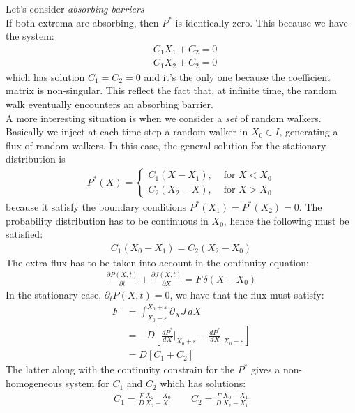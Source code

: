 \documentclass[4apaper,11pt,fleqn]{article}
\theoremstyle{remark}
\theoremstyle{definition}
\begin{document}
Let's consider \emph{absorbing barriers}\\
If both extrema are absorbing, then $P^*$ is identically zero. This because we have the system:
\begin{align*}
  &C_1 X_1 + C_2 = 0 \\
  &C_1 X_2 + C_2 = 0
\end{align*}
which has solution $C_1 = C_2 = 0$ and it's the only one because the coefficient matrix is non-singular. This reflect the fact that, at infinite time, the random walk eventually encounters an absorbing barrier. \\
A more interesting situation is when we consider a \emph{set} of random walkers. Basically we inject at each time step a random walker in $X_0 \in I$, generating a flux of random walkers.
In this case, the general solution for the stationary distribution is
\begin{align*}
  P^{*}(X)=\left\{\begin{array}{ll}{C_{1}\left(X-X_{1}\right),} & {\text { for } X<X_{0}} \\
  {C_{2}\left(X_{2}-X\right),} & {\text { for } X>X_{0}}\end{array}\right. %
\end{align*}
because it satisfy the boundary conditions $P^*(X_1)=P^*(X_2)=0$. The probability distribution has to be continuous in $X_0$, hence the following must be satisfied:
\begin{align*}
  C_{1}\left(X_{0}-X_{1}\right)=C_{2}\left(X_{2}-X_{0}\right)
\end{align*}
The extra flux has to be taken into account in the continuity equation:
\begin{align*}
  \frac{\partial P(X, t)}{\partial t}+\frac{\partial J(X, t)}{\partial X}= F \, \delta (X - X_0)
\end{align*}
In the stationary case, $\partial_t P(X,t) = 0$, we have that the flux must satisfy:
\begin{align*}
  F &= \int_{X_0 - \varepsilon}^{X_0 + \varepsilon} \partial_X J \, dX  \\
    &= -D \left[ \frac{d P^*}{dX}\Bigr|_{X_0 + \varepsilon} - \frac{d P^*}{dX}\Bigr|_{X_0 - \varepsilon} \right] \\
    &= D [C_1 + C_2]
\end{align*}
The latter along with the continuity constrain for the $P^*$ gives a non-homogeneous system for $C_1$ and $C_2$ which has solutions:
\begin{align*}
  C_1 = \frac{F}{D} \frac{X_2 - X_0}{X_2 - X_1} \qquad C_2 = \frac{F}{D} \frac{X_0 - X_1}{X_2 - X_1}
\end{align*}
\end{document}
